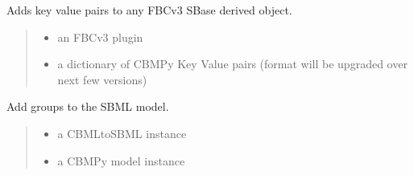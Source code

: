 \documentclass[letterpaper,12pt,english]{sphinxmanual}
\begin{document}

\begin{fulllineitems}
\label{\detokenize{api/io:cbmpy.CBXML.sbml_setFBCv3KeyValuePairs}}
\pysigstartsignatures
\pysiglinewithargsret
{}
{\sphinxparamcomma {}}
{}
\pysigstopsignatures
\sphinxAtStartPar
Adds key value pairs to any FBCv3 SBase derived object.
\begin{quote}\begin{description}
\begin{itemize}
\item {} 
\sphinxAtStartPar
{} \textendash{} an FBCv3 plugin

\item {} 
\sphinxAtStartPar
{} \textendash{} a dictionary of CBMPy Key Value pairs (format will be upgraded over next few versions)

\end{itemize}

\end{description}\end{quote}

\end{fulllineitems}


\begin{fulllineitems}
\label{\detokenize{api/io:cbmpy.CBXML.sbml_setGroupsL3}}
\pysigstartsignatures
\pysiglinewithargsret
{}
{\sphinxparamcomma {}}
{}
\pysigstopsignatures
\sphinxAtStartPar
Add groups to the SBML model.
\begin{quote}\begin{description}
\begin{itemize}
\item {} 
\sphinxAtStartPar
{} \textendash{} a CBMLtoSBML instance

\item {} 
\sphinxAtStartPar
{} \textendash{} a CBMPy model instance

\end{itemize}

\end{description}\end{quote}

\end{fulllineitems}
\end{document}
